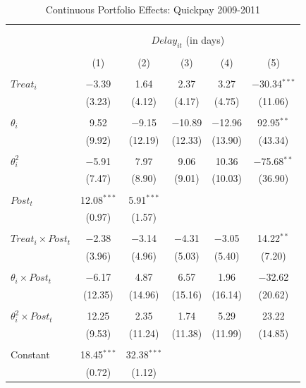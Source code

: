 \documentclass[
]{article}
\begin{document}
\begin{table}[H] \centering 
  \caption{Continuous Portfolio Effects: Quickpay 2009-2011} 
  \label{} 
\small 
\begin{tabular}{@{\extracolsep{-2pt}}lccccc} 
\\[-1.8ex]\hline 
\hline \\[-1.8ex] 
\\[-1.8ex] & \multicolumn{5}{c}{$Delay_{it}$ (in days)} \\ 
\\[-1.8ex] & (1) & (2) & (3) & (4) & (5)\\ 
\hline \\[-1.8ex] 
 $Treat_i$ & $-$3.39 & 1.64 & 2.37 & 3.27 & $-$30.34$^{***}$ \\ 
  & (3.23) & (4.12) & (4.17) & (4.75) & (11.06) \\ 
  & & & & & \\ 
 $\theta_i$ & 9.52 & $-$9.15 & $-$10.89 & $-$12.96 & 92.95$^{**}$ \\ 
  & (9.92) & (12.19) & (12.33) & (13.90) & (43.34) \\ 
  & & & & & \\ 
 $\theta_i^2$ & $-$5.91 & 7.97 & 9.06 & 10.36 & $-$75.68$^{**}$ \\ 
  & (7.47) & (8.90) & (9.01) & (10.03) & (36.90) \\ 
  & & & & & \\ 
 $Post_t$ & 12.08$^{***}$ & 5.91$^{***}$ &  &  &  \\ 
  & (0.97) & (1.57) &  &  &  \\ 
  & & & & & \\ 
 $Treat_i \times Post_t$ & $-$2.38 & $-$3.14 & $-$4.31 & $-$3.05 & 14.22$^{**}$ \\ 
  & (3.96) & (4.96) & (5.03) & (5.40) & (7.20) \\ 
  & & & & & \\ 
 $\theta_i \times Post_t$ & $-$6.17 & 4.87 & 6.57 & 1.96 & $-$32.62 \\ 
  & (12.35) & (14.96) & (15.16) & (16.14) & (20.62) \\ 
  & & & & & \\ 
 $\theta_i^2 \times Post_t$ & 12.25 & 2.35 & 1.74 & 5.29 & 23.22 \\ 
  & (9.53) & (11.24) & (11.38) & (11.99) & (14.85) \\ 
  & & & & & \\ 
 Constant & 18.45$^{***}$ & 32.38$^{***}$ &  &  &  \\ 
  & (0.72) & (1.12) &  &  &  \\ 

\end{tabular}
\end{table}
\end{document}
